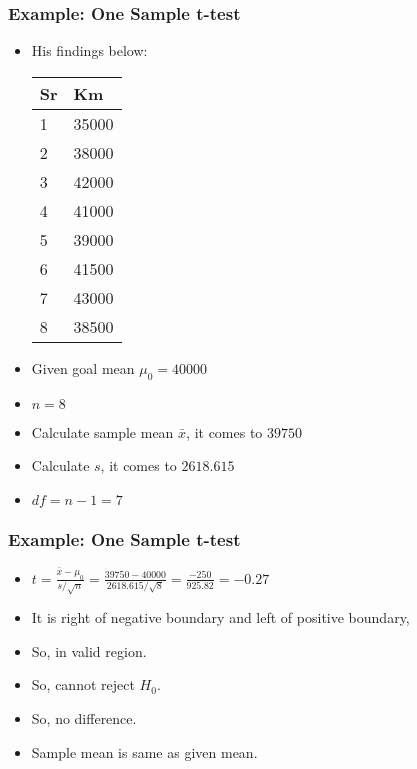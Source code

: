 \begin{frame}[fragile]\frametitle{Example: One Sample t-test}

\begin{itemize}
\item  His findings below:
 
\begin{tabular}{l|l}
Sr	&Km\\ \hline
1 & 35000\\
2 & 38000\\
3 & 42000\\
4 & 41000\\
5 & 39000\\
6 & 41500\\
7 & 43000\\
8 & 38500\\
\end{tabular}
\item Given goal mean $\mu_0 = 40000$
\item $n = 8$
\item Calculate sample mean $\bar{x}$, it comes to $39750$
\item Calculate $s$, it comes to $2618.615$
\item $df = n -1 = 7$
\end{itemize}
\end{frame}

\begin{frame}[fragile]\frametitle{Example: One Sample t-test}

\begin{itemize}
\item $t = \frac{\bar{x} - \mu_0}{s /\sqrt{n}} = \frac{39750 - 40000}{2618.615 /\sqrt{8}} = \frac{-250}{925.82} = - 0.27$
\item It is right of negative boundary and left of positive boundary, 
\item So, in valid region.
\item So, cannot reject $H_0$. 
\item So, no difference. 
\item Sample mean is same as given mean.
\end{itemize}
\end{frame}


